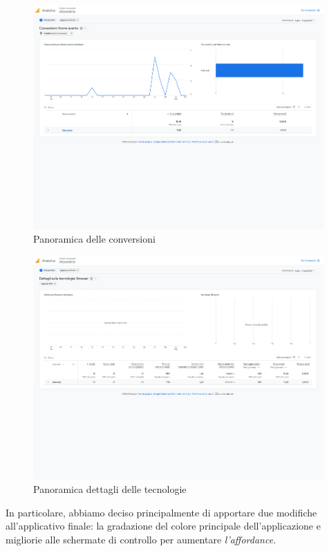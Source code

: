 \begin{figure}[H]
    \centering
    \includegraphics[width=0.99\textwidth]{Immagini/Alexandria/Report/conversioni-1.png}
    \caption{Panoramica delle conversioni}
    \label{fig:mesh}
\end{figure}

\begin{figure}[H]
    \centering
    \includegraphics[width=0.99\textwidth]{Immagini/Alexandria/Report/dettagliTecnologia-1.png}
    \caption{Panoramica dettagli delle tecnologie}
    \label{fig:mesh}
\end{figure}

In particolare, abbiamo deciso principalmente di apportare due modifiche all'applicativo finale: la gradazione del colore principale dell'applicazione e migliorie alle schermate di controllo per aumentare \textit{l'affordance.}

